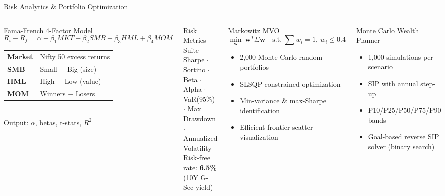 \documentclass[aspectratio=169, 11pt]{beamer}
\begin{document}
\begin{frame}{Risk Analytics \& Portfolio Optimization}
\begin{columns}[T]
\begin{block}{Fama-French 4-Factor Model}
\small
$$R_i - R_f = \alpha + \beta_1 MKT + \beta_2 SMB + \beta_3 HML + \beta_4 MOM$$
\footnotesize
\vspace{0.1cm}
\begin{tabular}{@{}ll@{}}
  \textbf{Market} & Nifty 50 excess returns \\
  \textbf{SMB} & Small $-$ Big (size) \\
  \textbf{HML} & High $-$ Low (value) \\
  \textbf{MOM} & Winners $-$ Losers \\
\end{tabular}\\[0.15cm]
Output: $\alpha$, betas, t-stats, $R^2$
\end{block}

\vspace{0.15cm}
\begin{block}{Risk Metrics Suite}
\footnotesize
Sharpe $\cdot$ Sortino $\cdot$ Beta $\cdot$ Alpha $\cdot$ VaR(95\%) $\cdot$ Max Drawdown $\cdot$ Annualized Volatility\\[0.1cm]
Risk-free rate: \textbf{6.5\%} (10Y G-Sec yield)
\end{block}

\begin{block}{Markowitz MVO}
\small
$$\min_{\mathbf{w}} \ \mathbf{w}^T \Sigma \mathbf{w} \quad \text{s.t.} \ \textstyle\sum w_i = 1, \ w_i \leq 0.4$$
\begin{itemize}
  \item 2,000 Monte Carlo random portfolios
  \item SLSQP constrained optimization
  \item Min-variance \& max-Sharpe identification
  \item Efficient frontier scatter visualization
\end{itemize}
\end{block}

\vspace{0.15cm}
\begin{block}{Monte Carlo Wealth Planner}
\footnotesize
\begin{itemize}
  \item 1,000 simulations per scenario
  \item SIP with annual step-up
  \item P10/P25/P50/P75/P90 bands
  \item Goal-based reverse SIP solver (binary search)
\end{itemize}
\end{block}
\end{columns}
\end{frame}
\end{document}
